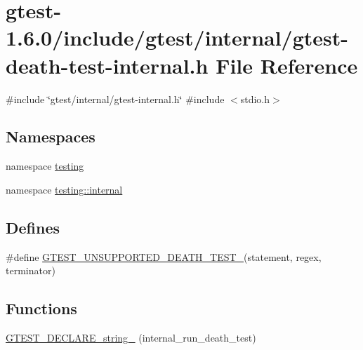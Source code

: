 \hypertarget{gtest-death-test-internal_8h}{\section{gtest-\/1.6.0/include/gtest/internal/gtest-\/death-\/test-\/internal.h \-File \-Reference}
\label{d0/d1a/gtest-death-test-internal_8h}
}
{\ttfamily \#include \char`\"{}gtest/internal/gtest-\/internal.\-h\char`\"{}}\*
{\ttfamily \#include $<$stdio.\-h$>$}\*
\subsection*{\-Namespaces}
\begin{DoxyCompactItemize}
\item 
namespace \hyperlink{namespacetesting}{testing}
\item 
namespace \hyperlink{namespacetesting_1_1internal}{testing\-::internal}
\end{DoxyCompactItemize}
\subsection*{\-Defines}
\begin{DoxyCompactItemize}
\item 
\#define \hyperlink{gtest-death-test-internal_8h_a29a145cda8bd2d0c6a78b0ac1d670d18}{\-G\-T\-E\-S\-T\-\_\-\-U\-N\-S\-U\-P\-P\-O\-R\-T\-E\-D\-\_\-\-D\-E\-A\-T\-H\-\_\-\-T\-E\-S\-T\-\_\-}(statement, regex, terminator)
\end{DoxyCompactItemize}
\subsection*{\-Functions}
\begin{DoxyCompactItemize}
\item 
\hyperlink{namespacetesting_1_1internal_a68c04af5e9ee070ca280dc312ed7a42c}{\-G\-T\-E\-S\-T\-\_\-\-D\-E\-C\-L\-A\-R\-E\-\_\-string\-\_\-} (internal\-\_\-run\-\_\-death\-\_\-test)
\end{DoxyCompactItemize}


